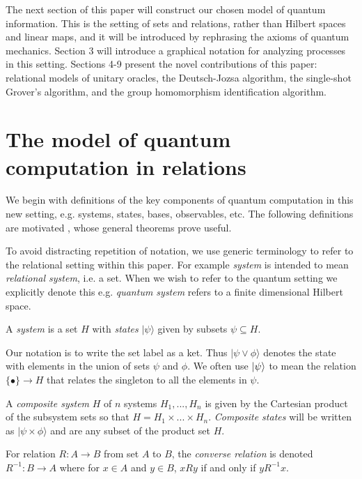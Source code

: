 The next section of this paper will construct our chosen model of quantum information.  This is the setting of sets and relations, rather than Hilbert spaces and linear maps, and it will be introduced by rephrasing the axioms of quantum mechanics. Section 3 will introduce a graphical notation for analyzing processes in this setting. Sections 4-9 present the novel contributions of this paper: relational models of unitary oracles, the Deutsch-Jozsa algorithm, the single-shot Grover's algorithm, and the group homomorphism identification algorithm.

\section{The model of quantum computation in relations}

We begin with definitions of the key components of quantum computation in this new setting, e.g. systems, states, bases, observables, etc.  The following definitions are motivated , whose general theorems prove useful.

To avoid distracting repetition of notation, we use generic terminology to refer to the relational setting within this paper.  For example \emph{system} is intended to mean \emph{relational system}, i.e. a set.  When we wish to refer to the quantum setting we explicitly denote this e.g. \emph{quantum system} refers to a finite dimensional Hilbert space.

\begin{axiom}
A \emph{system} is a set $H$ with \emph{states} $|\psi\rangle$ given by subsets $\psi\subseteq H$.
\end{axiom}


\noindent Our notation is to write the set label as a ket. Thus $|\psi\vee\phi\rangle$ denotes the state with elements in the union of sets $\psi$ and $\phi$. We often use $| \psi \rangle$ to mean the relation $\{\bullet\}\to H$ that relates the singleton to all the elements in $\psi$.

\begin{axiom}
A \emph{composite system} $H$ of $n$ systems $H_1,...,H_n$ is given by the Cartesian product of the subsystem sets so that $H = H_1\times...\times H_n$. \emph{Composite states} will be written as $|\psi\times\phi\rangle$ and are any subset of the product set $H$.
\end{axiom}

\begin{defn}
For relation $R:A\to B$ from set $A$ to $B$, the \emph{converse relation} is denoted $R^{-1}:B\to A$ where for $x\in A$ and $y\in B$, $xRy$ if and only if $yR^{-1}x$.
\end{defn}

